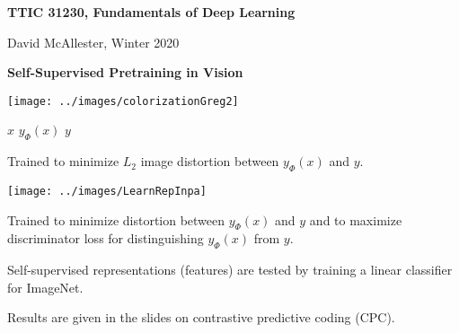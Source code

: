 





{\Huge
  \centerline{\bf TTIC 31230,  Fundamentals of Deep Learning}
  \vfill
  \centerline{David McAllester, Winter 2020}
  \vfill
  \centerline{\bf Self-Supervised Pretraining in Vision}
  \vfill
  \vfill
  

\vfill
\centerline{\texttt{[image: ../images/colorizationGreg2]}}
\centerline{$x$ \hspace{4em} $y_\Phi(x)$ \hspace{4em} $y$}

\vfill
Trained to minimize $L_2$ image distortion between $y_\Phi(x)$ and $y$.


\centerline{\texttt{[image: ../images/LearnRepInpa]}}

Trained to minimize distortion between $y_\Phi(x)$ and $y$ and to {\color{red} maximize} discriminator loss for distinguishing $y_\Phi(x)$ from $y$.


Self-supervised representations (features) are tested by training a {\color{red} linear} classifier for ImageNet.

\vfill
Results are given in the slides on contrastive predictive coding (CPC).


}

